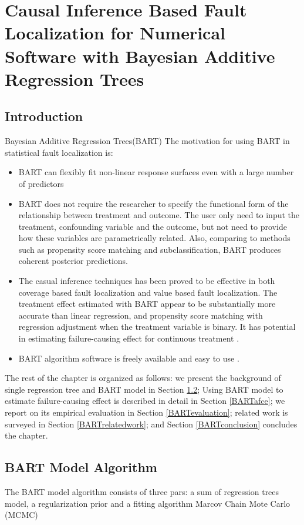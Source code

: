 \chapter{Causal Inference Based Fault Localization for Numerical Software with Bayesian Additive Regression Trees}\label{chap:BART}


\section{Introduction}\label{BARTintro}
\vspace{-2pt}
Bayesian Additive Regression Trees(BART)
The motivation for using BART in statistical fault localization is:
\vspace{-0.2cm}
\begin{itemize}
\item BART can flexibly fit non-linear response surfaces even with a large number of predictors
\item BART does not require the researcher to specify the functional form of the relationship between treatment and outcome. The user only need to input the treatment, confounding variable and the outcome, but not need to provide how these variables are parametrically related. Also, comparing to methods such as propensity score matching and subclassification, BART produces coherent posterior predictions. 
\item The casual inference techniques has been proved to be effective in both coverage based fault localization and value based fault localization. The treatment effect estimated with BART appear to be substantially more accurate than linear regression, and propensity score matching with regression adjustment when the treatment variable is binary. It has potential in estimating failure-causing effect for continuous treatment \cite{}.
\item BART algorithm software is freely available and easy to use \cite{}.
\end{itemize}

The rest of the chapter is organized as follows: we present the background of single regression tree and BART model in Section \ref{BARTbg}; Using BART model to estimate failure-causing effect is described in detail in Section \ref{BARTafce};  we report on its empirical evaluation in Section \ref{BARTevaluation}; related work is surveyed in Section \ref{BARTrelatedwork}; and Section \ref{BARTconclusion} concludes the chapter.

\section{BART Model Algorithm}\label{BARTbg}%
The BART model algorithm consists of three pars: a sum of regression trees model, a regularization prior and a fitting algorithm Marcov Chain Mote Carlo (MCMC) 
